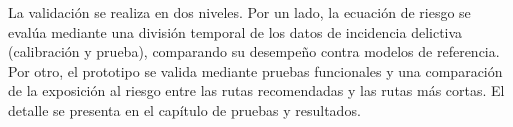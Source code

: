 
La validación se realiza en dos niveles. Por un lado, la ecuación de riesgo se evalúa mediante una división temporal de los datos de incidencia delictiva (calibración y prueba), comparando su desempeño contra modelos de referencia. Por otro, el prototipo se valida mediante pruebas funcionales y una comparación de la exposición al riesgo entre las rutas recomendadas y las rutas más cortas. El detalle se presenta en el capítulo de pruebas y resultados.

